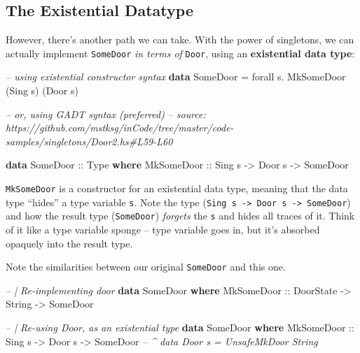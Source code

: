 \documentclass[]{article}
\newenvironment{Shaded}{}{}
\newcommand{\CommentTok}[1]{\textcolor[rgb]{0.38,0.63,0.69}{\textit{#1}}}
\newcommand{\DataTypeTok}[1]{\textcolor[rgb]{0.56,0.13,0.00}{#1}}
\newcommand{\FunctionTok}[1]{\textcolor[rgb]{0.02,0.16,0.49}{#1}}
\newcommand{\KeywordTok}[1]{\textcolor[rgb]{0.00,0.44,0.13}{\textbf{#1}}}
\newcommand{\NormalTok}[1]{#1}
\newcommand{\OtherTok}[1]{\textcolor[rgb]{0.00,0.44,0.13}{#1}}
\begin{document}
\hypertarget{the-existential-datatype}{%
\subsection{The Existential Datatype}\label{the-existential-datatype}}

However, there's another path we can take. With the power of singletons, we can
actually implement \texttt{SomeDoor} \emph{in terms of} \texttt{Door}, using an
\textbf{existential data type}:

\begin{Shaded}
\begin{Highlighting}[]
\CommentTok{-- using existential constructor syntax}
\KeywordTok{data} \DataTypeTok{SomeDoor} \FunctionTok{=}\NormalTok{ forall s}\FunctionTok{.} \DataTypeTok{MkSomeDoor}\NormalTok{ (}\DataTypeTok{Sing}\NormalTok{ s) (}\DataTypeTok{Door}\NormalTok{ s)}

\CommentTok{-- or, using GADT syntax (preferred)}
\CommentTok{-- source: https://github.com/mstksg/inCode/tree/master/code-samples/singletons/Door2.hs#L59-L60}

\KeywordTok{data} \DataTypeTok{SomeDoor}\OtherTok{ ::} \DataTypeTok{Type} \KeywordTok{where}
    \DataTypeTok{MkSomeDoor}\OtherTok{ ::} \DataTypeTok{Sing}\NormalTok{ s }\OtherTok{->} \DataTypeTok{Door}\NormalTok{ s }\OtherTok{->} \DataTypeTok{SomeDoor}
\end{Highlighting}
\end{Shaded}

\texttt{MkSomeDoor} is a constructor for an existential data type, meaning that
the data type ``hides'' a type variable \texttt{s}. Note the type
(\texttt{Sing\ s\ -\textgreater{}\ Door\ s\ -\textgreater{}\ SomeDoor}) and how
the result type (\texttt{SomeDoor}) \emph{forgets} the \texttt{s} and hides all
traces of it. Think of it like a type variable sponge -- type variable goes in,
but it's absorbed opaquely into the result type.

Note the similarities between our original \texttt{SomeDoor} and this one.

\begin{Shaded}
\begin{Highlighting}[]
\CommentTok{-- | Re-implementing door}
\KeywordTok{data} \DataTypeTok{SomeDoor} \KeywordTok{where}
    \DataTypeTok{MkSomeDoor}\OtherTok{ ::} \DataTypeTok{DoorState} \OtherTok{->} \DataTypeTok{String} \OtherTok{->} \DataTypeTok{SomeDoor}

\CommentTok{-- | Re-using Door, as an existential type}
\KeywordTok{data} \DataTypeTok{SomeDoor} \KeywordTok{where}
    \DataTypeTok{MkSomeDoor}\OtherTok{  ::} \DataTypeTok{Sing}\NormalTok{ s  }\OtherTok{->} \DataTypeTok{Door}\NormalTok{ s }\OtherTok{->} \DataTypeTok{SomeDoor}
                            \CommentTok{-- ^ data Door s = UnsafeMkDoor String}
\end{Highlighting}
\end{Shaded}
\end{document}

